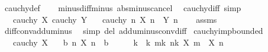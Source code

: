 \begin{isabellebody}
\ cauchy{\isacharunderscore}{\kern0pt}def\isanewline
\ \ \isamarkupfalse%
\ minus{\isacharunderscore}{\kern0pt}diff{\isacharunderscore}{\kern0pt}minus\ abs{\isacharunderscore}{\kern0pt}minus{\isacharunderscore}{\kern0pt}cancel\ \isacommand{{\isachardot}{\kern0pt}}\isamarkupfalse%
%
\endisatagproof
{\isafoldproof}%
%
\isadelimproof
\isanewline
%
\endisadelimproof
\isanewline
{}\isamarkupfalse%
\ cauchy{\isacharunderscore}{\kern0pt}diff\ {\isacharbrackleft}{\kern0pt}simp{\isacharbrackright}{\kern0pt}{\isacharcolon}{\kern0pt}\isanewline
\ \ \ {\isachardoublequoteopen}cauchy\ X{\isachardoublequoteclose}\ {\isachardoublequoteopen}cauchy\ Y{\isachardoublequoteclose}\isanewline
\ \ \ {\isachardoublequoteopen}cauchy\ {\isacharparenleft}{\kern0pt}{\isasymlambda}n{\isachardot}{\kern0pt}\ X\ n\ {\isacharminus}{\kern0pt}\ Y\ n{\isacharparenright}{\kern0pt}{\isachardoublequoteclose}\isanewline
%
\isadelimproof
\ \ %
\endisadelimproof
%
\isatagproof
{}\isamarkupfalse%
\ assms\ \isamarkupfalse%
\ diff{\isacharunderscore}{\kern0pt}conv{\isacharunderscore}{\kern0pt}add{\isacharunderscore}{\kern0pt}uminus\ \isamarkupfalse%
\ {\isacharparenleft}{\kern0pt}simp\ del{\isacharcolon}{\kern0pt}\ add{\isacharunderscore}{\kern0pt}uminus{\isacharunderscore}{\kern0pt}conv{\isacharunderscore}{\kern0pt}diff{\isacharparenright}{\kern0pt}%
\endisatagproof
{\isafoldproof}%
%
\isadelimproof
\isanewline
%
\endisadelimproof
\isanewline
{}\isamarkupfalse%
\ cauchy{\isacharunderscore}{\kern0pt}imp{\isacharunderscore}{\kern0pt}bounded{\isacharcolon}{\kern0pt}\isanewline
\ \ \ {\isachardoublequoteopen}cauchy\ X{\isachardoublequoteclose}\isanewline
\ \ \ {\isachardoublequoteopen}{\isasymexists}b{\isachargreater}{\kern0pt}{}{\isachardot}{\kern0pt}\ {\isasymforall}n{\isachardot}{\kern0pt}\ {\isasymbar}X\ n{\isasymbar}\ {\isacharless}{\kern0pt}\ b{\isachardoublequoteclose}\isanewline
%
\isadelimproof
%
\endisadelimproof
%
\isatagproof
{}\isamarkupfalse%
\ {\isacharminus}{\kern0pt}\isanewline
\ \ \isamarkupfalse%
\ k\ \ k{\isacharcolon}{\kern0pt}\ {\isachardoublequoteopen}{\isasymforall}m{\isasymge}k{\isachardot}{\kern0pt}\ {\isasymforall}n{\isasymge}k{\isachardot}{\kern0pt}\ {\isasymbar}X\ m\ {\isacharminus}{\kern0pt}\ X\ n{\isasymbar}\ {\isacharless}{\kern0pt}\ {}{\isachardoublequoteclose}\isanewline
\ \ \ \ \isamarkupfalse%

\end{isabellebody}
